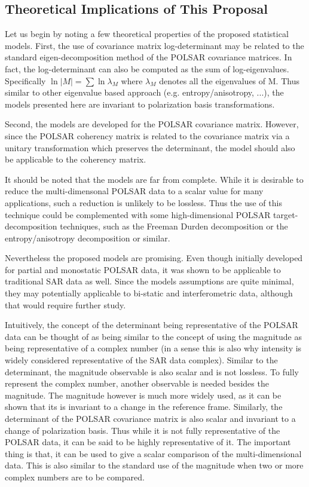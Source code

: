 \documentclass[journal]{IEEEtran}
\begin{document}
\subsection{Theoretical Implications of This Proposal}
\label{sec:discussion}

Let us begin by noting a few theoretical properties of the proposed statistical models.
First, the use of covariance matrix log-determinant may be related to the standard eigen-decomposition method of the POLSAR covariance matrices.
In fact, the log-determinant can also be computed as the sum of log-eigenvalues.
Specifically $\ln{|M|} = \sum \ln{\lambda_M}$ where $\lambda_M$ denotes all the eigenvalues of M.
Thus similar to other eigenvalue based approach (e.g. entropy/anisotropy, ...),
  the models presented here are invariant to polarization basis transformations.

Second, the models are developed for the POLSAR covariance matrix.
However, since the POLSAR coherency matrix is related to the covariance matrix via a unitary transformation which preserves the determinant,
  the model should also be applicable to the coherency matrix.

It should be noted that the models are far from complete.
While it is desirable to reduce the multi-dimensonal POLSAR data to a scalar value for many applications,
  such a reduction is unlikely to be lossless.  
Thus %
the use of this technique could be complemented with some high-dimensional POLSAR target-decomposition techniques, such as the Freeman Durden decomposition \cite{Freeman_1998_TGRS_963} or the entropy/anisotropy decomposition \cite{Cloude_1997_TGRS_68} or similar.

Nevertheless the proposed models are promising.
Even though initially developed for partial and monostatic POLSAR data,
  it was shown to be applicable to traditional SAR data as well.
Since the models assumptions are quite minimal, they may potentially applicable to bi-static and interferometric data, although that would require further study.

Intuitively, the concept of the determinant being representative of the POLSAR data can be thought of as being similar to the concept of using the magnitude as being representative of a complex number
(in a sense this is also why intensity is widely considered representative of the SAR data complex).
Similar to the determinant, the magnitude observable is also scalar and is not lossless.
To fully represent the complex number, another observable is needed besides the magnitude.
The magnitude however is much more widely used, as it can be shown that its is invariant to a change in the reference frame.
Similarly, the determinant of the POLSAR covariance matrix is also scalar and invariant to a change of polarization basis.
Thus while it is not fully representative of the POLSAR data, it can be said to be highly representative of it.
The important thing is that, it can be used to give a scalar comparison of the multi-dimensional data.
This is also similar to the standard use of the magnitude when two or more complex numbers are to be compared. %
\end{document}
